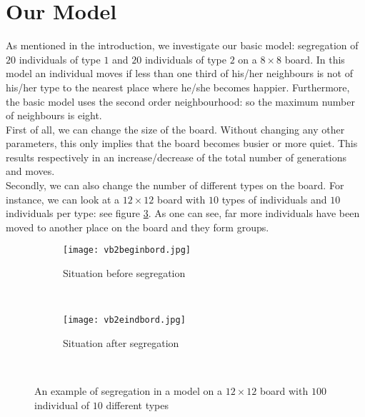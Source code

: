 \section{Our Model}

As mentioned in the introduction, we investigate our basic model: segregation of $20$ individuals of type $1$ and $20$ individuals of type $2$ on a $8 \times 8$ board.
In this model an individual moves if less than one third of his/her neighbours is not of his/her type to the nearest place where he/she becomes happier.
Furthermore, the basic model uses the second order neighbourhood: so the maximum number of neighbours is eight.\\

First of all, we can change the size of the board.
Without changing any other parameters, this only implies that the board becomes busier or more quiet.
This results respectively in an increase/decrease of the total number of generations and moves.\\

Secondly, we can also change the number of different types on the board.
For instance, we can look at a $12\times 12$ board with $10$ types of individuals and $10$ individuals per type: see figure \ref{fig:example big board}.
As one can see, far more individuals have been moved to another place on the board and they form groups.

\begin{figure}[H]
	\centering
    \begin{subfigure}{0.45\textwidth}
        \texttt{[image: vb2beginbord.jpg]}
        \caption{Situation before segregation}
        \label{fig:example big board begin}
    \end{subfigure}\hspace{0cm}
    ~ 
    \begin{subfigure}{0.45\textwidth}
        \texttt{[image: vb2eindbord.jpg]}
        \caption{Situation after segregation}
        \label{fig:example big board end}
    \end{subfigure}
    ~ 
    \caption{An example of segregation in a model on a $12\times 12$ board with $100$ individual of $10$ different types}
    \label{fig:example big board}
\end{figure}




